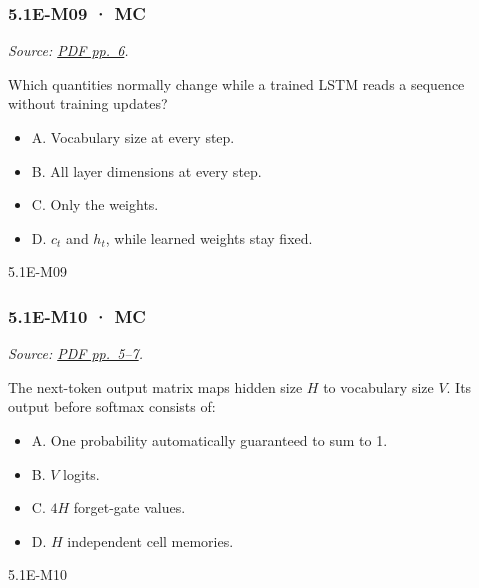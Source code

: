 \noindent\begin{minipage}{\linewidth}

\subsubsection{5.1E-M09 · MC}\label{e-m09-mc}

\emph{Source:
\href{../Lecture\%20Slides/5.1.\%20Extra\%20Material.pdf\#page=6}{PDF
pp.~6}.}

Which quantities normally change while a trained LSTM reads a sequence
without training updates?

\begin{itemize}
\tightlist
\item
  A. Vocabulary size at every step.
\item
  B. All layer dimensions at every step.
\item
  C. Only the weights.
\item
  D. \(c_t\) and \(h_t\), while learned weights stay fixed.
\end{itemize}

\begin{solution}[8mm]{5.1E-M09}

\end{solution}
\end{minipage}\par\medskip

\noindent\begin{minipage}{\linewidth}

\subsubsection{5.1E-M10 · MC}\label{e-m10-mc}

\emph{Source:
\href{../Lecture\%20Slides/5.1.\%20Extra\%20Material.pdf\#page=5}{PDF
pp.~5--7}.}

The next-token output matrix maps hidden size \(H\) to vocabulary size
\(V\). Its output before softmax consists of:

\begin{itemize}
\tightlist
\item
  A. One probability automatically guaranteed to sum to 1.
\item
  B. \(V\) logits.
\item
  C. \(4H\) forget-gate values.
\item
  D. \(H\) independent cell memories.
\end{itemize}

\begin{solution}[8mm]{5.1E-M10}

\end{solution}
\end{minipage}\par\medskip

